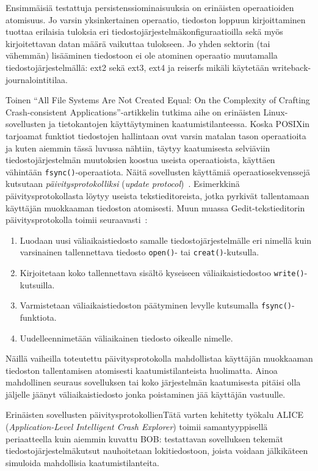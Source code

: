 Ensimmäisiä testattuja persistenssiominaisuuksia on erinäisten operaatioiden atomisuus.
Jo varsin yksinkertainen operaatio, tiedoston loppuun kirjoittaminen tuottaa erilaisia tuloksia eri tiedostojärjestelmäkonfiguraatioilla
sekä myös kirjoitettavan datan määrä vaikuttaa tulokseen.
Jo yhden sektorin (tai vähemmän) lisääminen tiedostoon ei ole atominen operaatio muutamalla tiedostojärjestelmällä: ext2 sekä
ext3, ext4 ja reiserfs mikäli käytetään writeback-journalointitilaa.

\cite{OptimisticCrashConsistency}

Toinen ``All File Systems Are Not Created Equal: On the Complexity of Crafting Crash-consistent Applications''-artikkelin tutkima aihe on erinäisten Linux-sovellusten ja tietokantojen käyttäytyminen kaatumistilanteessa.
Koska POSIXin tarjoamat funktiot tiedostojen hallintaan ovat varsin matalan tason operaatioita ja kuten aiemmin tässä luvussa nähtiin,
täytyy kaatumisesta selviäviin tiedostojärjestelmän muutoksien koostua useista operaatioista, käyttäen vähintään \texttt{fsync()}-operaatiota.
Näitä sovellusten käyttämiä operaatiosekvenssejä kutsutaan \emph{päivitysprotokolliksi} (\emph{update protocol})~\cite{PosixDataConsistency}.
Esimerkkinä päivitysprotokollasta löytyy useista tekstieditoreista, jotka pyrkivät tallentamaan käyttäjän muokkaaman tiedoston atomisesti.
Muun muassa Gedit-tekstieditorin päivitysprotokolla toimii seuraavasti~\cite{OptimisticCrashConsistency}:
\begin{enumerate}
    \item{Luodaan uusi väliaikaistiedosto samalle tiedostojärjestelmälle eri nimellä kuin varsinainen tallennettava tiedosto \texttt{open()}- tai \texttt{creat()}-kutsulla.}
    \item{Kirjoitetaan koko tallennettava sisältö kyseiseen väliaikaistiedostoo \texttt{write()}-kutsuilla.}
    \item{Varmistetaan väliaikaistiedoston päätyminen levylle kutsumalla \texttt{fsync()}-funktiota.}
    \item{Uudelleennimetään väliaikainen tiedosto oikealle nimelle.}
\end{enumerate}
Näillä vaiheilla toteutettu päivitysprotokolla mahdollistaa käyttäjän muokkaaman tiedoston tallentamisen atomisesti kaatumistilanteista huolimatta.
Ainoa mahdollinen seuraus sovelluksen tai koko järjestelmän kaatumisesta pitäisi olla jäljelle jäänyt väliaikaistiedosto jonka poistaminen jää käyttäjän vastuulle.

Erinäisten sovellusten päivitysprotokollienTätä varten kehitetty työkalu ALICE (\emph{Application-Level Intelligent Crash Explorer}) toimii samantyyppisellä periaatteella kuin aiemmin kuvattu BOB:
testattavan sovelluksen tekemät tiedostojärjestelmäkutsut nauhoitetaan lokitiedostoon,
joista voidaan jälkikäteen simuloida mahdollisia kaatumistilanteita.

